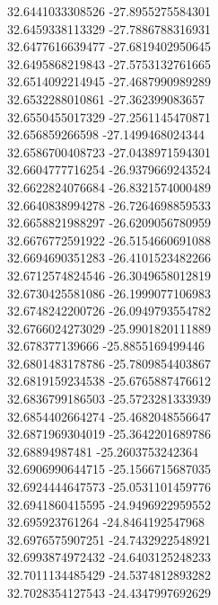 {32.6441033308526	-27.8955275584301\\
32.6459338113329	-27.7886788316931\\
32.6477616639477	-27.6819402950645\\
32.6495868219843	-27.5753132761665\\
32.6514092214945	-27.4687990989289\\
32.6532288010861	-27.362399083657\\
32.6550455017329	-27.2561145470871\\
32.656859266598	-27.1499468024344\\
32.6586700408723	-27.0438971594301\\
32.6604777716254	-26.9379669243524\\
32.6622824076684	-26.8321574000489\\
32.6640838994278	-26.7264698859533\\
32.6658821988297	-26.6209056780959\\
32.6676772591922	-26.5154660691088\\
32.6694690351283	-26.4101523482266\\
32.6712574824546	-26.3049658012819\\
32.6730425581086	-26.1999077106983\\
32.6748242200726	-26.0949793554782\\
32.6766024273029	-25.9901820111889\\
32.678377139666	-25.8855169499446\\
32.6801483178786	-25.7809854403867\\
32.6819159234538	-25.6765887476612\\
32.6836799186503	-25.5723281333939\\
32.6854402664274	-25.4682048556647\\
32.6871969304019	-25.3642201689786\\
32.68894987481	-25.2603753242364\\
32.6906990644715	-25.1566715687035\\
32.6924444647573	-25.0531101459776\\
32.6941860415595	-24.9496922959552\\
32.695923761264	-24.8464192547968\\
32.6976575907251	-24.7432922548921\\
32.6993874972432	-24.6403125248233\\
32.7011134485429	-24.5374812893282\\
32.7028354127543	-24.4347997692629\\
}
